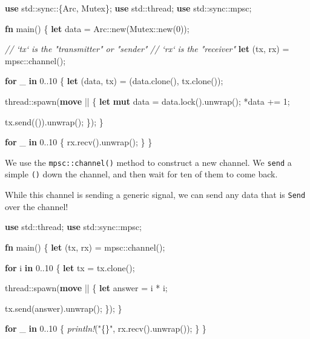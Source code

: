 \documentclass[a4paper,]{book}
\newenvironment{Shaded}{\begin{snugshade}}{\end{snugshade}}
\newcommand{\KeywordTok}[1]{\textcolor[rgb]{0.13,0.29,0.53}{\textbf{{#1}}}}
\newcommand{\DecValTok}[1]{\textcolor[rgb]{0.00,0.00,0.81}{{#1}}}
\newcommand{\StringTok}[1]{\textcolor[rgb]{0.31,0.60,0.02}{{#1}}}
\newcommand{\CommentTok}[1]{\textcolor[rgb]{0.56,0.35,0.01}{\textit{{#1}}}}
\newcommand{\PreprocessorTok}[1]{\textcolor[rgb]{0.56,0.35,0.01}{\textit{{#1}}}}
\newcommand{\NormalTok}[1]{{#1}}
\begin{document}
\begin{Shaded}
\begin{Highlighting}[]
\KeywordTok{use} \NormalTok{std::sync::\{Arc, Mutex\};}
\KeywordTok{use} \NormalTok{std::thread;}
\KeywordTok{use} \NormalTok{std::sync::mpsc;}

\KeywordTok{fn} \NormalTok{main() \{}
    \KeywordTok{let} \NormalTok{data = Arc::new(Mutex::new(}\DecValTok{0}\NormalTok{));}

    \CommentTok{// `tx` is the "transmitter" or "sender"}
    \CommentTok{// `rx` is the "receiver"}
    \KeywordTok{let} \NormalTok{(tx, rx) = mpsc::channel();}

    \KeywordTok{for} \NormalTok{_ }\KeywordTok{in} \DecValTok{0.}\NormalTok{.}\DecValTok{10} \NormalTok{\{}
        \KeywordTok{let} \NormalTok{(data, tx) = (data.clone(), tx.clone());}

        \NormalTok{thread::spawn(}\KeywordTok{move} \NormalTok{|| \{}
            \KeywordTok{let} \KeywordTok{mut} \NormalTok{data = data.lock().unwrap();}
            \NormalTok{*data += }\DecValTok{1}\NormalTok{;}

            \NormalTok{tx.send(()).unwrap();}
        \NormalTok{\});}
    \NormalTok{\}}

    \KeywordTok{for} \NormalTok{_ }\KeywordTok{in} \DecValTok{0.}\NormalTok{.}\DecValTok{10} \NormalTok{\{}
        \NormalTok{rx.recv().unwrap();}
    \NormalTok{\}}
\NormalTok{\}}
\end{Highlighting}
\end{Shaded}

We use the \texttt{mpsc::channel()} method to construct a new channel.
We \texttt{send} a simple \texttt{()} down the channel, and then wait
for ten of them to come back.

While this channel is sending a generic signal, we can send any data
that is \texttt{Send} over the channel!

\begin{Shaded}
\begin{Highlighting}[]
\KeywordTok{use} \NormalTok{std::thread;}
\KeywordTok{use} \NormalTok{std::sync::mpsc;}

\KeywordTok{fn} \NormalTok{main() \{}
    \KeywordTok{let} \NormalTok{(tx, rx) = mpsc::channel();}

    \KeywordTok{for} \NormalTok{i }\KeywordTok{in} \DecValTok{0.}\NormalTok{.}\DecValTok{10} \NormalTok{\{}
        \KeywordTok{let} \NormalTok{tx = tx.clone();}

        \NormalTok{thread::spawn(}\KeywordTok{move} \NormalTok{|| \{}
            \KeywordTok{let} \NormalTok{answer = i * i;}

            \NormalTok{tx.send(answer).unwrap();}
        \NormalTok{\});}
    \NormalTok{\}}

    \KeywordTok{for} \NormalTok{_ }\KeywordTok{in} \DecValTok{0.}\NormalTok{.}\DecValTok{10} \NormalTok{\{}
        \PreprocessorTok{println!}\NormalTok{(}\StringTok{"\{\}"}\NormalTok{, rx.recv().unwrap());}
    \NormalTok{\}}
\NormalTok{\}}
\end{Highlighting}
\end{Shaded}
\end{document}
